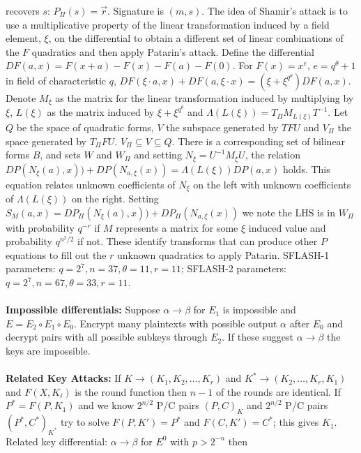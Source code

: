 recovers $s$: $P_{\Pi}(s)= {\vec r}$.  Signature is $(m,s)$.  The 
idea of Shamir's attack is to use a multiplicative property of the linear transformation
induced by a field element, $\xi$, on the differential to obtain a different set of
linear combinations of the $F$ quadratics and then apply Patarin's attack.
Define the differential $DF(a,x)= F(x+a) -F(x) -F(a) -F(0)$.  For $F(x)= x^e$,
$e= q^{\theta}+1$ in field of characteristic $q$,
$DF(\xi \cdot a , x) + DF(a, \xi \cdot x) = (\xi + \xi^{q^{\theta}}) DF(a , x)$.
Denote $M_{\xi}$ as the matrix for the linear transformation induced by multiplying
by $\xi$, $L(\xi)$ as the matrix induced by $\xi+ \xi^{q^{\theta}}$ and
$\Lambda(L(\xi))= T_{\Pi} M_{L(\xi)}T^{-1}$.  Let $Q$ be the space of
quadratic forms, $V$ the subspace generated by $TFU$ and $V_{\Pi}$ the space generated
by $T_{\Pi}FU$.  $V_{\Pi} \subseteq V \subseteq Q$.  There is a corresponding set
of bilinear forms $B$, and sets $W$ and $W_{\Pi}$ and setting
$N_{\xi}= U^{-1}M_{\xi}U$, the relation
$DP(N_{\xi}(a),x))+DP(N_{a, \xi}(x))= \Lambda(L(\xi)) DP(a,x)$ holds.
This equation relates unknown coefficients of $N_{\xi}$ on the left with unknown coefficients
of $\Lambda(L(\xi))$ on the right.  Setting $S_M(a,x)=
DP_{\Pi}(N_{\xi}(a),x))+DP_{\Pi}(N_{a, \xi}(x))$ we note the LHS is in $W_{\Pi}$ with probability
$q^{-r}$ if $M$ represents a matrix for some $\xi$ induced value and probability
$q^{n^2/2}$ if not.  These identify transforms that can produce other $P$ equations to fill
out the $r$ unknown quadratics to apply Patarin.
SFLASH-1 parameters: $q=2^7, n=37, \theta=11, r=11$;
SFLASH-2 parameters: $q=2^7, n=67, \theta=33, r=11$.
\\
\\
{\bf Impossible differentials:} Suppose $\alpha \rightarrow \beta$ for 
$E_1$ is impossible and $E= E_2 \circ E_1 \circ E_0$.  Encrypt many plaintexts
with possible output $\alpha$ after $E_0$ and decrypt pairs with all possible
subkeys through $E_2$.  If these suggest $\alpha \rightarrow \beta$ the keys are
impossible.
\\
\\
{\bf Related Key Attacks:} If
$K \rightarrow (K_1, K_2, \ldots, K_r)$ and
$K^* \rightarrow (K_2, \ldots, K_r, K_1)$ and $F(X, K_i)$ is the round function then
$n-1$ of the rounds are identical.  If $P^*=F(P,K_1)$ and we know
$2^{n/2}$ P/C pairs $(P, C)_{K}$ and
$2^{n/2}$ P/C pairs $(P^*, C^*)_{K^*}$ try to solve 
$F(P, K')=P^*$ and $F(C, K')=C^*$; this gives
$K_1$.  Related key differential: $\alpha \rightarrow \beta$ for $E^0$ with 
$p > 2^{-n}$ then 
